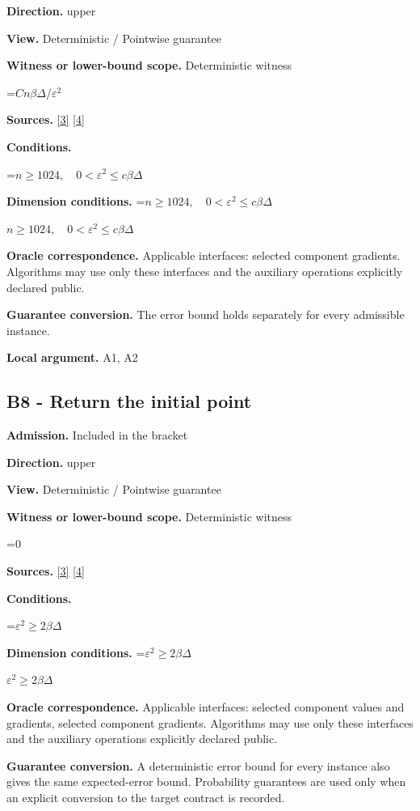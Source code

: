 \documentclass[10pt,a4paper]{article}
\newcommand{\AtlasMath}[1]{\par\begingroup\centering\setbox0=\hbox{$\displaystyle #1$}\ifdim\wd0>1.4\linewidth\typeout{ATLAS WIDE FORMULA: \the\wd0}\fi\ifdim\wd0>\linewidth\resizebox{\linewidth}{!}{\box0}\else\box0\fi\par\endgroup}
\newcommand{\AtlasInlineMath}[1]{\begingroup\setbox0=\hbox{$#1$}\ifdim\wd0>.4\linewidth\endgroup\AtlasMath{#1}\else\endgroup$#1$\fi}
\begin{document}
\textbf{Direction.} upper

\textbf{View.} Deterministic / Pointwise guarantee

\textbf{Witness or lower-bound scope.} Deterministic witness

\AtlasMath{Cn\beta\Delta/\varepsilon^2}
\textbf{Sources.} \href{https://proceedings.mlr.press/v97/zhou19b/zhou19b.pdf}{[3]} \href{https://arxiv.org/pdf/1405.4980}{[4]}

\textbf{Conditions.} 
\AtlasMath{n\ge1024,\quad0<\varepsilon^2\le c\beta\Delta}


\textbf{Dimension conditions.} \AtlasInlineMath{n\ge1024,\quad0<\varepsilon^2\le c\beta\Delta}

\textbf{Oracle correspondence.} Applicable interfaces: selected component gradients. Algorithms may use only these interfaces and the auxiliary operations explicitly declared public.

\textbf{Guarantee conversion.} The error bound holds separately for every admissible instance.

\textbf{Local argument.} A1, A2

\subsection{B8 - Return the initial point}
\textbf{Admission.} Included in the bracket

\textbf{Direction.} upper

\textbf{View.} Deterministic / Pointwise guarantee

\textbf{Witness or lower-bound scope.} Deterministic witness

\AtlasMath{0}
\textbf{Sources.} \href{https://proceedings.mlr.press/v97/zhou19b/zhou19b.pdf}{[3]} \href{https://arxiv.org/pdf/1405.4980}{[4]}

\textbf{Conditions.} 
\AtlasMath{\varepsilon^2\ge2\beta\Delta}


\textbf{Dimension conditions.} \AtlasInlineMath{\varepsilon^2\ge2\beta\Delta}

\textbf{Oracle correspondence.} Applicable interfaces: selected component values and gradients, selected component gradients. Algorithms may use only these interfaces and the auxiliary operations explicitly declared public.

\textbf{Guarantee conversion.} A deterministic error bound for every instance also gives the same expected-error bound. Probability guarantees are used only when an explicit conversion to the target contract is recorded.
\end{document}
